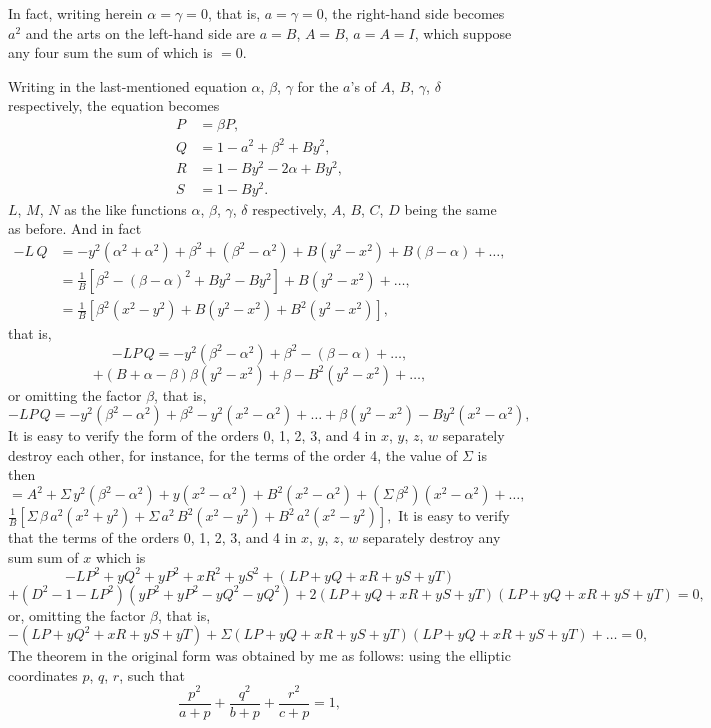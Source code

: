 \documentclass[11pt,a4paper]{book}
\begin{document}

\newpage
In fact, writing herein $\alpha=\gamma=0$, that is, $a=\gamma=0$, the right-hand side becomes $a^2$ and the arts on the left-hand side are $a=B$, $A=B$, $a=A=I$, which suppose any four sum the sum of which is $=0$.

Writing in the last-mentioned equation $\alpha$, $\beta$, $\gamma$ for the $a$'s of $A$, $B$, $\gamma$, $\delta$ respectively, the equation becomes
\begin{align*}
P&=\beta P,\\
Q&=1-a^2+\beta^2+By^2,\\
R&=1-By^2-2\alpha+By^2,\\
S&=1-By^2.
\end{align*}
$L$, $M$, $N$ as the like functions $\alpha$, $\beta$, $\gamma$, $\delta$ respectively, $A$, $B$, $C$, $D$ being the same as before. And in fact
\begin{align*}
-L\,Q&=-y^2(\alpha^2+\alpha^2)+\beta^2+(\beta^2-\alpha^2)+B(y^2-x^2)+B(\beta-\alpha)+\dots,\\
&=\frac{1}{B}\left[\beta^2-(\beta-\alpha)^2+By^2-By^2\right]+B(y^2-x^2)+\dots,\\
&=\frac{1}{B}\left[\beta^2(x^2-y^2)+B(y^2-x^2)+B^2(y^2-x^2)\right],
\end{align*}
that is,
\[
-LP\,Q=-y^2(\beta^2-\alpha^2)+\beta^2-(\beta-\alpha)+\dots,
\]
\[
+(B+\alpha-\beta)\beta(y^2-x^2)+\beta-B^2(y^2-x^2)+\dots,
\]
or omitting the factor $\beta$, that is,
\[
-LP\,Q=-y^2(\beta^2-\alpha^2)+\beta^2-y^2(x^2-\alpha^2)+\dots+\beta(y^2-x^2)-By^2(x^2-\alpha^2),
\]
It is easy to verify the form of the orders 0, 1, 2, 3, and 4 in $x$, $y$, $z$, $w$ separately destroy each other, for instance, for the terms of the order 4, the value of $\Sigma$ is then
\[
=A^2+\Sigma\,y^2(\beta^2-\alpha^2)+y(x^2-\alpha^2)+B^2(x^2-\alpha^2)+(\Sigma\,\beta^2)(x^2-\alpha^2)+\dots,
\]
$\frac{1}{B}\left[\Sigma\,\beta\,a^2(x^2+y^2)+\Sigma\,a^2\,B^2(x^2-y^2)+B^2\,a^2(x^2-y^2)\right],$
It is easy to verify that the terms of the orders 0, 1, 2, 3, and 4 in $x$, $y$, $z$, $w$ separately destroy any sum sum of $x$ which is
\[
-LP^2+yQ^2+yP^2+xR^2+yS^2+(LP+yQ+xR+yS+yT)
\]
\[
+(D^2-1-LP^2)(yP^2+yP^2-yQ^2-yQ^2)+2(LP+yQ+xR+yS+yT)(LP+yQ+xR+yS+yT)=0,
\]
or, omitting the factor $\beta$, that is,
\[
-(LP+yQ^2+xR+yS+yT)+\Sigma(LP+yQ+xR+yS+yT)(LP+yQ+xR+yS+yT)+\dots=0,
\]
The theorem in the original form was obtained by me as follows: using the elliptic coordinates $p$, $q$, $r$, such that
\[
\frac{p^2}{a+p}+\frac{q^2}{b+p}+\frac{r^2}{c+p}=1,
\]
\end{document}
